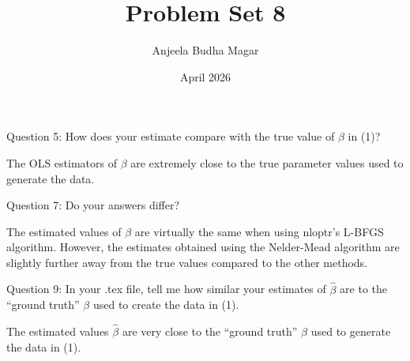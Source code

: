 \documentclass{article}
\title{Problem Set 8}
\author{Anjeela Budha Magar}
\date{April 2026}
\begin{document}
\maketitle

\noindent Question 5: How does your estimate compare with the true value of $\beta$ in (1)?

\vspace{0.3cm}

The OLS estimators of $\beta$ are extremely close to the true parameter values used to generate the data.

\vspace{0.5cm}

\noindent Question 7: Do your answers differ?

\vspace{0.3cm}

The estimated values of $\beta$ are virtually the same when using nloptr’s L-BFGS algorithm. However, the estimates obtained using the Nelder-Mead algorithm are slightly further away from the true values compared to the other methods.

\vspace{0.5cm}

\noindent Question 9: In your .tex file, tell me how similar your estimates of $\hat{\beta}$ are to the “ground truth” $\beta$ used to create the data in (1).

\vspace{0.3cm}

The estimated values $\hat{\beta}$ are very close to the “ground truth” $\beta$ used to generate the data in (1).

\vspace{0.5cm}


\end{document}
